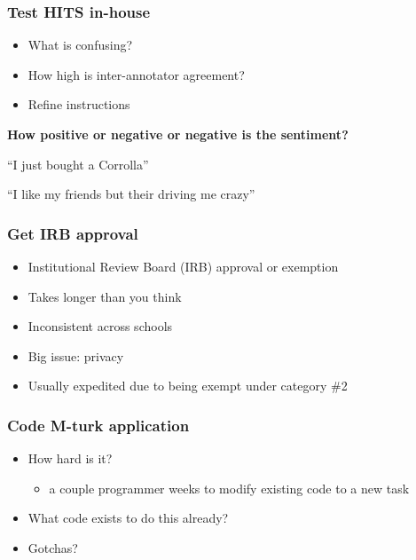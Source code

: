\documentclass[slides]{beamer} %
\begin{document}
\begin{frame}\frametitle{Test HITS in-house}

\begin{itemize}
  \item What is confusing?
  \item How high is inter-annotator agreement?
  \item Refine instructions
\end{itemize}

{\bf How positive or negative or negative is the sentiment?}

\vspace{0.2cm}

``I just bought a Corrolla''

\vspace{0.1cm}

``I like my friends but their driving me crazy''

\end{frame}
\begin{frame}\frametitle{Get IRB approval}

\begin{itemize}
  \item Institutional Review Board (IRB) approval or exemption
  \item Takes longer than you think
  \item Inconsistent across schools
  \item Big issue: privacy
  \item Usually expedited due to being exempt under category \#2
\end{itemize}

\end{frame}

\begin{frame}\frametitle{Code M-turk application}

\begin{itemize}
  \item How hard is it?
 \begin{itemize}
    \item a couple programmer weeks to modify existing code to a new task
 \end{itemize}
  \item What code exists to do this already?
  \item Gotchas?
\end{itemize}

\end{frame}
\end{document}
